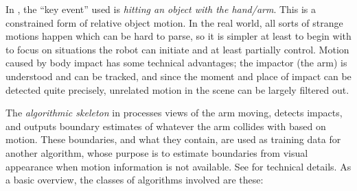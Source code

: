 %
%


In , the ``key event'' used is {\em
hitting an object with the hand/arm}.  This is a constrained form of
relative object motion.  In the real world, all sorts of strange
motions happen which can be hard to parse, so it is simpler at least
to begin with to focus on situations the robot can initiate and at
least partially control.
%
%
Motion caused by body impact has some technical advantages; the
impactor (the arm) is understood and can be tracked, and since the moment 
and place of
impact can be detected quite precisely, unrelated motion in the scene
can be largely filtered out.

The {\em algorithmic skeleton} in \cite{fitzpatrick03grounding}
processes views of the arm moving, detects impacts, and
outputs boundary estimates of whatever the arm collides with based on
motion.  These boundaries, and what they contain, are used as training
data for another algorithm, whose purpose is to estimate boundaries
from visual appearance when motion information is not available.
%
%
See  for technical details.
As a basic overview, the classes of algorithms involved are these:




